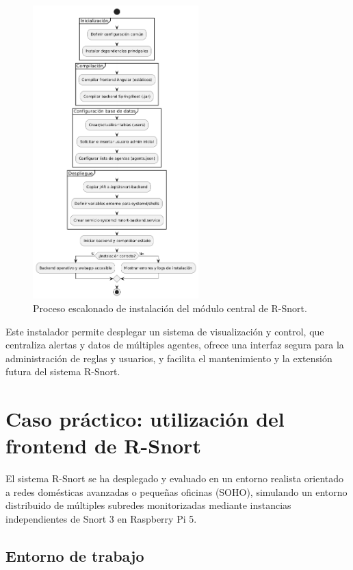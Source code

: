 \documentclass[11pt,a4paper,twoside]{report}
\begin{document}
\begin{figure}[H]
	\centering
	\includegraphics[width=0.57\textwidth]{documento/30.png}
	\caption{Proceso escalonado de instalación del módulo central de R-Snort.}
	\label{fig:bpmn-snort-central}
\end{figure}

Este instalador permite desplegar un sistema de visualización y control, que centraliza alertas y datos de múltiples agentes, ofrece una interfaz segura para la administración de reglas y usuarios, y facilita el mantenimiento y la extensión futura del sistema R-Snort.


\clearpage
\null
\thispagestyle{empty}
\newpage
\chapter{Caso práctico: utilización del frontend de R-Snort}

El sistema R-Snort se ha desplegado y evaluado en un entorno realista orientado a redes domésticas avanzadas o pequeñas oficinas (SOHO), simulando un entorno distribuido de múltiples subredes monitorizadas mediante instancias independientes de Snort 3 en Raspberry Pi 5.

\section{Entorno de trabajo}
\end{document}
